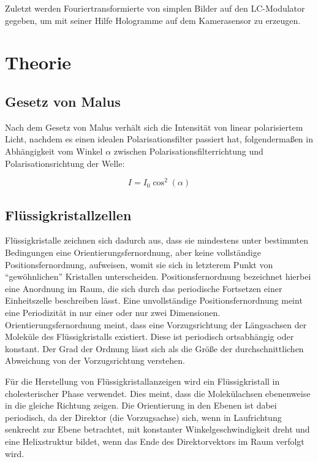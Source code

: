 \documentclass[
	a4paper,
	12pt,
	pagesize,
	ngerman
]{scrartcl}
\begin{document}
	Zuletzt werden Fouriertransformierte von simplen Bilder auf den LC-Modulator gegeben, um mit seiner Hilfe Hologramme auf dem Kamerasensor zu erzeugen.

  \section{Theorie}

	\subsection{Gesetz von Malus}

	Nach dem Gesetz von Malus verhält sich die Intensität von linear polarisiertem Licht, nachdem es einen idealen Polarisationsfilter passiert hat, folgendermaßen in Abhängigkeit vom Winkel $\alpha $ zwischen Polarisationsfilterrichtung und Polarisationsrichtung der Welle:

	\begin{equation}
		I = I_0 \cos ^2(\alpha)
	\end{equation}

	\subsection{Flüssigkristallzellen}

	Flüssigkristalle zeichnen sich dadurch aus, dass sie mindestens unter bestimmten Bedingungen eine Orientierungsfernordnung, aber keine vollständige Positionsfernordnung, aufweisen, womit sie sich in letzterem Punkt von \enquote{gewöhnlichen} Kristallen unterscheiden.
	Positionsfernordnung bezeichnet hierbei eine Anordnung im Raum, die sich durch das periodische Fortsetzen einer Einheitszelle beschreiben lässt.
	Eine unvollständige Positionsfernordnung meint eine Periodizität in nur einer oder nur zwei Dimensionen.
	Orientierungsfernordnung meint, dass eine Vorzugsrichtung der Längsachsen der Moleküle des Flüssigkristalls existiert.
	Diese ist periodisch ortsabhängig oder konstant.
	Der Grad der Ordnung lässt sich als die Größe der durchschnittlichen Abweichung von der Vorzugsrichtung verstehen.

	Für die Herstellung von Flüssigkristallanzeigen wird ein Flüssigkristall in cholesterischer Phase verwendet. %
	Dies meint, dass die Molekülachsen ebenenweise in die gleiche Richtung zeigen.
	Die Orientierung in den Ebenen ist dabei periodisch, da der Direktor (die Vorzugsachse) sich, wenn in Laufrichtung senkrecht zur Ebene betrachtet, mit konstanter Winkelgeschwindigkeit dreht und  eine Helixstruktur bildet, wenn das Ende des Direktorvektors im Raum verfolgt wird.
\end{document}

